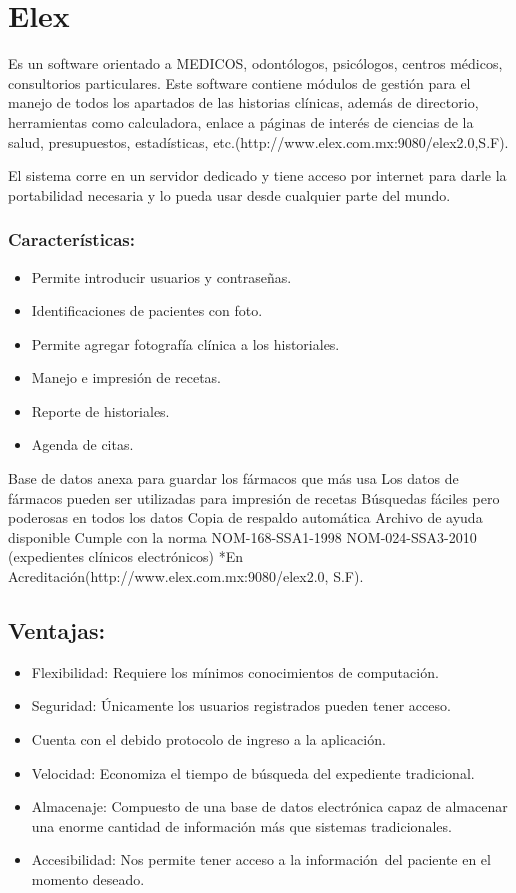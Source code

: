 \section{Elex}
Es un software orientado a MEDICOS, odontólogos, psicólogos, centros médicos, consultorios particulares. Este software contiene módulos de gestión para el manejo de todos los apartados de las historias clínicas, además de directorio, herramientas como calculadora, enlace a páginas de interés de ciencias de la salud, presupuestos, estadísticas, etc.(http://www.elex.com.mx:9080/elex2.0,S.F).

El sistema corre en un servidor dedicado y tiene acceso por internet para darle la portabilidad necesaria y lo pueda usar desde cualquier parte del mundo.
\subsubsection{Características:}
  \begin{itemize}
    \item Permite introducir usuarios y contraseñas.
    \item Identificaciones de pacientes con foto.
    \item Permite agregar fotografía clínica a los historiales.
    \item Manejo e impresión de recetas.
    \item Reporte de historiales.
    \item Agenda de citas.

  \end{itemize}


Base de datos anexa para guardar los fármacos que más usa
Los datos de fármacos pueden ser utilizadas para impresión de recetas
Búsquedas fáciles pero poderosas en todos los datos
Copia de respaldo automática
Archivo de ayuda disponible
Cumple con la norma NOM-168-SSA1-1998
NOM-024-SSA3-2010 (expedientes clínicos electrónicos) *En Acreditación(http://www.elex.com.mx:9080/elex2.0, S.F).

\subsection{Ventajas:}
\begin{itemize}
  \item Flexibilidad: Requiere los mínimos conocimientos de computación.
  \item Seguridad: Únicamente los usuarios registrados pueden tener acceso. 
  \item Cuenta con el debido protocolo de ingreso a la aplicación.
  \item Velocidad: Economiza el tiempo de búsqueda del expediente tradicional.
  \item Almacenaje: Compuesto de una base de datos electrónica capaz de almacenar una enorme cantidad de información más que sistemas tradicionales.
  \item Accesibilidad: Nos permite tener acceso a la información del paciente en el momento deseado.

\end{itemize}

